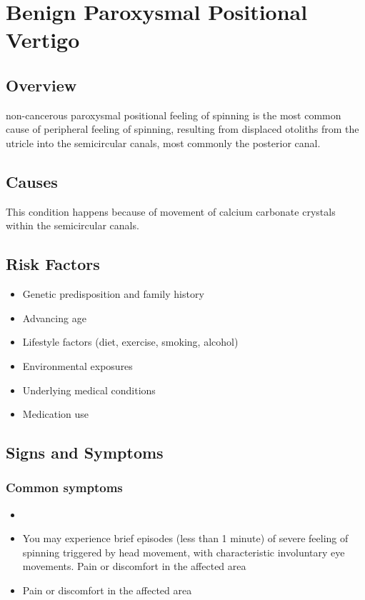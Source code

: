 \chapter{Benign Paroxysmal Positional Vertigo}
\label{sec:Benign Paroxysmal Positional Vertigo}

\section{Overview}
non-cancerous paroxysmal positional feeling of spinning is the most common cause of peripheral feeling of spinning, resulting from displaced otoliths from the utricle into the semicircular canals, most commonly the posterior canal.
\section{Causes}
This condition happens because of movement of calcium carbonate crystals within the semicircular canals.     
\section{Risk Factors}

\begin{itemize}[noitemsep]
  \item Genetic predisposition and family history
  \item Advancing age
  \item Lifestyle factors (diet, exercise, smoking, alcohol)
  \item Environmental exposures
  \item Underlying medical conditions
  \item Medication use
\end{itemize}
\section{Signs and Symptoms}

\subsection{Common symptoms}
\begin{itemize}[noitemsep]
  \item \item You may experience brief episodes (less than 1 minute) of severe feeling of spinning triggered by head movement, with characteristic involuntary eye movements. Pain or discomfort in the affected area    \item Pain or discomfort in the affected area
  \end{itemize}

